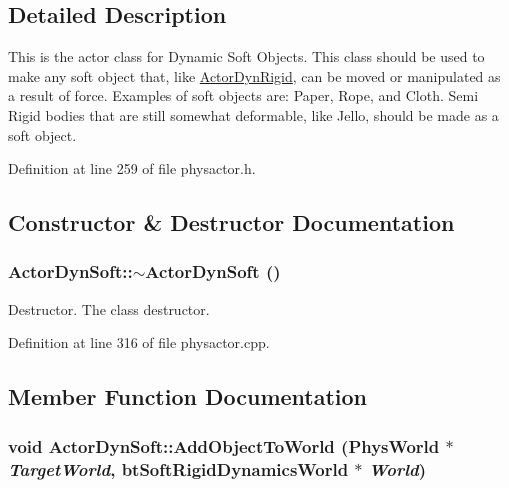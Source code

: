 \subsection{Detailed Description}
This is the actor class for Dynamic Soft Objects. This class should be used to make any soft object that, like \hyperlink{classActorDynRigid}{ActorDynRigid}, can be moved or manipulated as a result of force. Examples of soft objects are: Paper, Rope, and Cloth. Semi Rigid bodies that are still somewhat deformable, like Jello, should be made as a soft object. 

Definition at line 259 of file physactor.h.

\subsection{Constructor \& Destructor Documentation}
\hypertarget{classActorDynSoft_a8d2941aee946c14ce616d4d856ddf758}{
\subsubsection[{$\sim$ActorDynSoft}]{\setlength{\rightskip}{0pt plus 5cm}ActorDynSoft::$\sim$ActorDynSoft ()}}
\label{dc/de0/classActorDynSoft_a8d2941aee946c14ce616d4d856ddf758}


Destructor. The class destructor. 

Definition at line 316 of file physactor.cpp.

\subsection{Member Function Documentation}
\hypertarget{classActorDynSoft_ab56b961689401e16962d653b977e5fd6}{
\subsubsection[{AddObjectToWorld}]{\setlength{\rightskip}{0pt plus 5cm}void ActorDynSoft::AddObjectToWorld ({\bf PhysWorld} $\ast$ {\em TargetWorld}, \/  btSoftRigidDynamicsWorld $\ast$ {\em World})}}
\label{dc/de0/classActorDynSoft_ab56b961689401e16962d653b977e5fd6}


